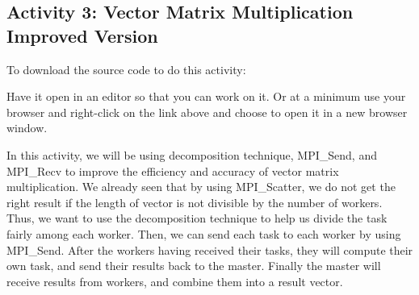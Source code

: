\documentclass[letterpaper,10pt,openany,oneside]{sphinxmanual}
\begin{document}
\subsection{Activity 3: Vector Matrix Multiplication Improved Version}
\label{DecompositionAndActivity/DecompositionAndActivity:activity-3-vector-matrix-multiplication-improved-version}
To download the source code to do this activity:

Have it open in an editor so that you can work on it.  Or at a minimum use your browser and right-click on the link above and choose to open it in a new browser window.

In this activity, we will be using decomposition technique, MPI\_Send, and MPI\_Recv to
improve the efficiency and accuracy of vector matrix multiplication. We already seen that by using
MPI\_Scatter, we do not get the right result if the length of vector is not divisible by
the number of workers. Thus, we want to use the decomposition technique to help us divide
the task fairly among each worker. Then, we can send each task to each worker by using MPI\_Send.
After the workers having received their tasks, they will compute their own task, and send their results
back to the master. Finally the master will receive results from workers, and combine them into a result vector.
\end{document}
